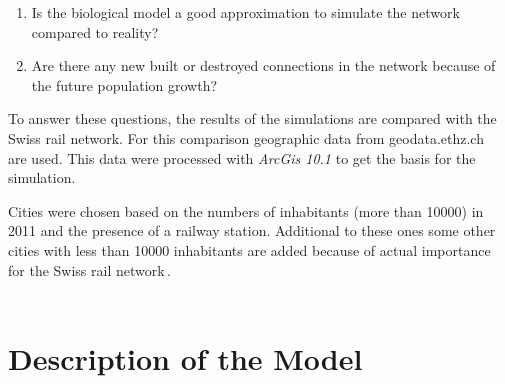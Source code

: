 \documentclass[11pt]{scrartcl}
\begin{document}
\begin{enumerate}
	\item Is the biological model a good approximation to simulate the network compared to reality?
	\item Are there any new built or destroyed connections in the network because of the future population growth?
\end{enumerate}

To answer these questions, the results of the simulations are compared with the Swiss rail network. For this comparison geographic data from geodata.ethz.ch~\cite{gis_data} are used. This data were processed with \textit{ArcGis 10.1} to get the basis for the simulation.

Cities were chosen based on the numbers of inhabitants (more than 10000) in 2011 and the presence of a railway station. Additional to these ones some other cities with less than 10000 inhabitants are added because of actual importance for the Swiss rail network\,\cite{bfs}. ~\\
~\\

\section{Description of the Model}
\label{sec:description}
\end{document}
